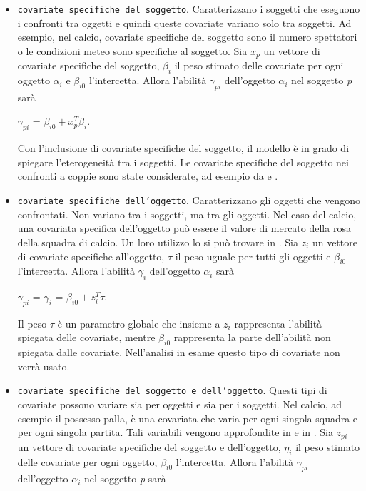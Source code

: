 \begin{itemize}
	\item \texttt{covariate specifiche del soggetto}. Caratterizzano i soggetti che eseguono i confronti tra oggetti e quindi queste covariate variano solo tra soggetti. Ad esempio, nel calcio, covariate specifiche del soggetto sono il numero spettatori o le condizioni meteo sono specifiche al soggetto. Sia $x_p$ un vettore di covariate specifiche del soggetto, $\beta_i$ il peso stimato delle covariate per ogni oggetto $\alpha_{i}$ e $\beta_{i0}$ l'intercetta. Allora l'abilità $\gamma_{pi}$ dell'oggetto $\alpha_{i}$ nel soggetto \emph{p} sarà
	\begin{center}
		$ \gamma_{pi}$ = $\beta_{i0} + x^{T}_{p}\beta_i$.
	\end{center}
	
	Con l'inclusione di covariate specifiche del soggetto, il modello è in grado di spiegare l'eterogeneità tra i soggetti. Le covariate specifiche del soggetto nei confronti a coppie sono state considerate, ad esempio da \textcite{francis2010} e \textcite{Turner2012Firth}.
	\item \texttt{covariate specifiche dell'oggetto}. Caratterizzano gli oggetti che vengono confrontati. Non variano tra i soggetti, ma tra gli oggetti. Nel caso del calcio, una covariata specifica dell'oggetto può essere il valore di mercato della rosa della squadra di calcio. Un loro utilizzo lo si può trovare in \textcite{schauberger2017}.
	Sia $z_{i}$ un vettore di covariate specifiche all'oggetto, $\tau$ il peso uguale per tutti gli oggetti e $\beta_{i0}$ l'intercetta. Allora l'abilità $\gamma_{i}$ dell'oggetto $\alpha_{i}$ sarà
	\begin{center}
		$\gamma_{pi}$ = $ \gamma_{i}$ = $\beta_{i0} + z^{T}_{i}\tau$.
	\end{center}
	Il peso $\tau$ è un parametro globale che insieme a $z_{i}$ rappresenta l'abilità spiegata delle covariate, mentre $\beta_{i0}$ rappresenta la parte dell'abilità non spiegata dalle covariate. Nell'analisi in esame questo tipo di covariate non verrà usato.
	\item \texttt{covariate specifiche del soggetto e dell'oggetto}. Questi tipi di covariate possono variare sia per oggetti e sia per i soggetti. Nel calcio, ad esempio il possesso palla, è una covariata che varia per ogni singola squadra e per ogni singola partita. Tali variabili vengono approfondite in \textcite{thurner2000policy} e in \textcite{mauerer2015modeling}. Sia $z_{pi}$ un vettore di covariate specifiche del soggetto e dell'oggetto, $\eta_i$ il peso stimato delle covariate per ogni oggetto, $\beta_{i0}$ l'intercetta. Allora l'abilità $\gamma_{pi}$ dell'oggetto $\alpha_{i}$ nel soggetto \emph{p} sarà

\end{itemize}
